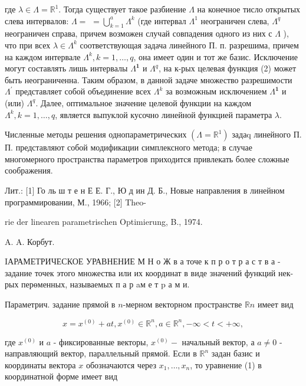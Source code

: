 \documentclass[10pt]{article}
\begin{document}
где $\lambda \in \Lambda=\mathbb{R}^{1}$. Тогда существует такое разбиение $\Lambda$ на конечное тисло открытых слева интервалов: $\Lambda=$ $=\bigcup_{k=1}^{a} \Lambda^{k}$ (где интервал $\Lambda^{1}$ неограничен слева, $\Lambda^{q}$ неограничен справа, причем возможен случай совпадения одного из них с $\Lambda$ ), что при всех $\lambda \in \Lambda^{k}$ соответствующая задача линейного П. п. разрешима, причем на каждом интервале $\Lambda^{k}, k=1, \ldots, q$, она имеет один и тот же базис. Исключение могут составлять лишь интервалы $\Lambda^{\mathbf{1}}$ и $\Lambda^{q}$, на к-рых целевая функция (2) может быть неограниченна. Таким образом, в данной задаче множество разрешимости $\Lambda^{\prime}$ представляет собой объединение всех $\Lambda^{k}$ за возможным исключением $\Lambda^{\mathbf{1}}$ и (или) $\Lambda^{q}$. Далее, оптимальное значение целевой функции на каждом $\Lambda^{k}, k=1, \ldots, q$, является выпуклой кусочно линейной функцией параметра $\lambda$.



Численные методы решения однопараметрических $\left(\Lambda=\mathbb{R}^{1}\right)$ задаq линейного П. П. представляют собой модификации симплексного метода; в случае многомерного пространства параметров приходится привлекать более сложные соображения.



Лит.: [1] Го ль ш т е н Е Е. Г., Ю д ин Д. Б., Новые направления в линейном программировании, М., 1966; [2] Theo-

rie der linearen parametrischen Optimierung, B., 1974.



A. A. Корбут.



IАРАМЕТРИЧЕСКОЕ УРАВНЕНИЕ М Н о Ж в а точе к п р о т р а с т в а - задание точек этого множества или их координат в виде значений функций нек-рых перөменных, называемых п а р aм е т p а м и.



Параметрич. задание прямой в $n$-мерном векторном пространстве $\mathbb{R} n$ имеет вид



\[

x=x^{(0)}+a t, x^{(0)} \in \mathbb{R}^{n}, a \in \mathbb{R}^{n},-\infty<t<+\infty,

\]



где $x^{(0)}$ и $a$ - фиксированные векторы, $x^{(0)}-$ начальный вектор, а $a \neq 0$ - направляющий вектор, параллельный прямой. Если в $\mathbb{R}^{n}$ задан базис и координаты вектора $x$ обозначаются через $x_{1}, \ldots, x_{n}$, то уравнение (1) в координатной форме имеет вид
\end{document}
